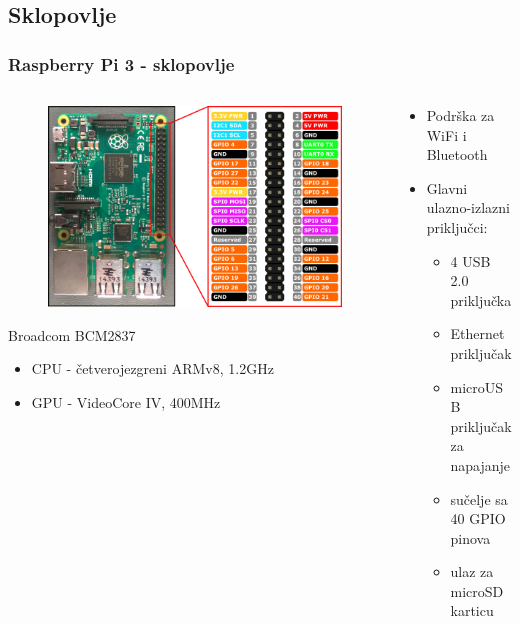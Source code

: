 \documentclass[12pt]{beamer}
\begin{document}
\subsection{Sklopovlje}
\begin{frame}
	\frametitle{Raspberry Pi 3 - sklopovlje}
	\begin{columns}[T]
	    \begin{column}{.5\textwidth}
		\begin{figure}[h]
			\begin{minipage}{\textwidth}
				\centering
				\includegraphics[width=\linewidth]{slike/pinout.png}
			\end{minipage}
		\end{figure}
		Broadcom BCM2837
			\begin{itemize}
				\item CPU - četverojezgreni ARMv8, 1.2GHz
				\item GPU - VideoCore IV, 400MHz
			\end{itemize}
		\end{column}

		\begin{column}{.5\textwidth}
			\begin{itemize}
				\item Podrška za WiFi i Bluetooth
				\item Glavni ulazno-izlazni priključci:
				\begin{itemize}
					\item 4 USB 2.0 priključka
					\item Ethernet priključak
					\item microUSB priključak za napajanje
					\item sučelje sa 40 GPIO pinova
					\item ulaz za microSD karticu
				\end{itemize}
			\end{itemize}
		\end{column}
	\end{columns}
\end{frame}
\end{document}
